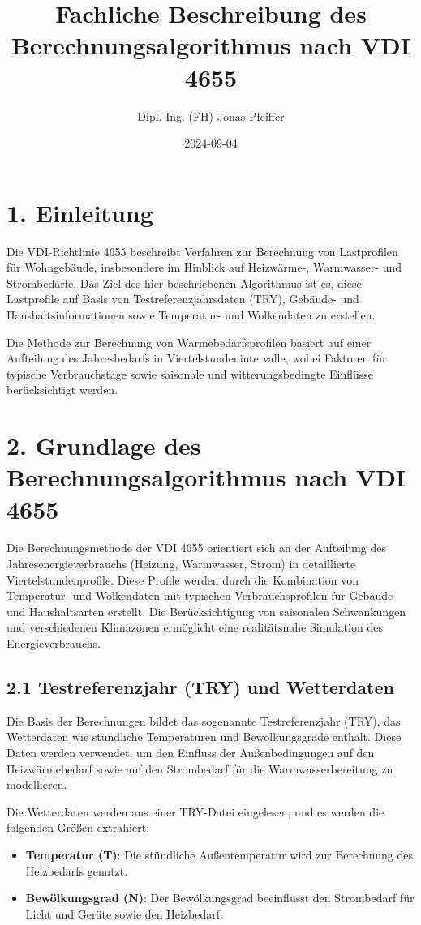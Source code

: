 \documentclass{article}
\title{Fachliche Beschreibung des Berechnungsalgorithmus nach VDI 4655}
\author{Dipl.-Ing. (FH) Jonas Pfeiffer}
\date{2024-09-04}
\begin{document}
\maketitle

\section*{1. Einleitung}
Die VDI-Richtlinie 4655 beschreibt Verfahren zur Berechnung von Lastprofilen für Wohngebäude, insbesondere im Hinblick auf Heizwärme-, Warmwasser- und Strombedarfe. Das Ziel des hier beschriebenen Algorithmus ist es, diese Lastprofile auf Basis von Testreferenzjahrsdaten (TRY), Gebäude- und Haushaltsinformationen sowie Temperatur- und Wolkendaten zu erstellen.

Die Methode zur Berechnung von Wärmebedarfsprofilen basiert auf einer Aufteilung des Jahresbedarfs in Viertelstundenintervalle, wobei Faktoren für typische Verbrauchstage sowie saisonale und witterungsbedingte Einflüsse berücksichtigt werden.

\section*{2. Grundlage des Berechnungsalgorithmus nach VDI 4655}

Die Berechnungsmethode der VDI 4655 orientiert sich an der Aufteilung des Jahresenergieverbrauchs (Heizung, Warmwasser, Strom) in detaillierte Viertelstundenprofile. Diese Profile werden durch die Kombination von Temperatur- und Wolkendaten mit typischen Verbrauchsprofilen für Gebäude- und Haushaltsarten erstellt. Die Berücksichtigung von saisonalen Schwankungen und verschiedenen Klimazonen ermöglicht eine realitätsnahe Simulation des Energieverbrauchs.

\subsection*{2.1 Testreferenzjahr (TRY) und Wetterdaten}
Die Basis der Berechnungen bildet das sogenannte Testreferenzjahr (TRY), das Wetterdaten wie stündliche Temperaturen und Bewölkungsgrade enthält. Diese Daten werden verwendet, um den Einfluss der Außenbedingungen auf den Heizwärmebedarf sowie auf den Strombedarf für die Warmwasserbereitung zu modellieren.

Die Wetterdaten werden aus einer TRY-Datei eingelesen, und es werden die folgenden Größen extrahiert:
\begin{itemize}
    \item \textbf{Temperatur (T)}: Die stündliche Außentemperatur wird zur Berechnung des Heizbedarfs genutzt.
    \item \textbf{Bewölkungsgrad (N)}: Der Bewölkungsgrad beeinflusst den Strombedarf für Licht und Geräte sowie den Heizbedarf.
\end{itemize}
\end{document}
